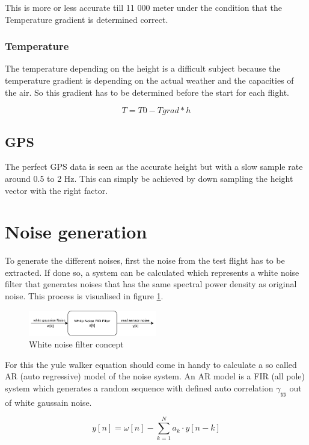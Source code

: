   This is more or less accurate till 11 000 meter under the condition that the Temperature gradient is determined correct. 

  \subsubsection{Temperature}
  The temperature depending on the height is a difficult subject because the temperature gradient is depending on the actual weather and the capacities of the air.
  So this gradient has to be determined before the start for each flight.

  $$T = T0 - Tgrad*h$$
  
  \subsection{GPS}
  The perfect GPS data is seen as the accurate height but with a slow sample rate around 0.5 to 2 Hz.
  This can simply be achieved by down sampling the height vector with the right factor.
  
  \section{Noise generation}
  To generate the different noises, first the noise from the test flight has to be extracted.
  If done so, a system can be calculated which represents a white noise filter that generates noises
  that has the same spectral power density as original noise. This process is visualised in figure \ref{fig:WhiteNoiseFilter}.
  
  \begin{figure}[h!]
 \centering
 \includegraphics[width=0.5\textwidth]{./Pictures/WhiteNoiseFilter.pdf}
 \caption{White noise filter concept}
 \label{fig:WhiteNoiseFilter}
\end{figure}
  
  
  For this the yule walker equation should come in handy to calculate a so called AR (auto regressive) model of the noise system.
  An AR model is a FIR (all pole) system which generates a random sequence with defined auto correlation $\gamma_{yy}$ out of white gaussain noise.
  
  $$ y[n] = \omega[n] - \sum_{k=1}^{N} a_k \cdot y[n-k]  $$
  
